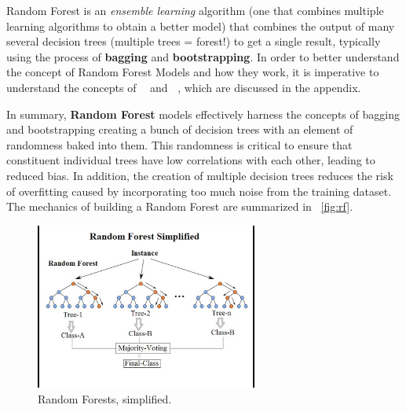 Random Forest \cite{brownlee2018} \cite{carbonati_rf_scratch} \cite{enoz_rf_medium} is an \textit{ensemble learning} algorithm (one that combines multiple learning algorithms to obtain a better model) that combines the output of many several decision trees (multiple trees = forest!) to get a single result, typically using the process of \textbf{bagging} and \textbf{bootstrapping}.
In order to better understand the concept of Random Forest Models and how they work, it is imperative to understand the concepts of \textbf{~} and \textbf{~}, which are discussed in the appendix.

In summary, \textbf{Random Forest} models effectively harness the concepts of bagging and bootstrapping creating a bunch of decision trees with an element of randomness baked into them.
This randomness is critical to ensure that constituent individual trees have low correlations with each other, leading to reduced bias.
In addition, the creation of multiple decision trees reduces the risk of overfitting caused by incorporating too much noise from the training dataset.
The mechanics of building a Random Forest are summarized in ~\autoref{fig:rf}.

\begin{figure}[!htbp]
    \centering
    \includegraphics[width=0.65\textwidth]{img-3.png}
    \caption[Random Forests, simplified.]{Random Forests, simplified.\protect \footnotemark}
    \label{fig:rf}
\end{figure}
\FloatBarrier


